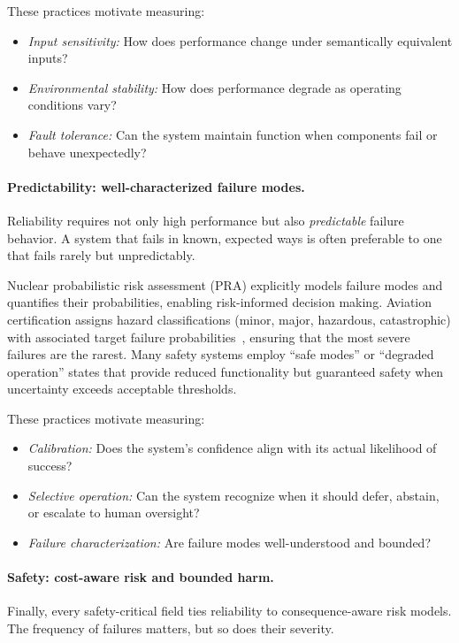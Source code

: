 \documentclass[11pt]{article}
\begin{document}
These practices motivate measuring:
\begin{itemize}[leftmargin=*, topsep=2pt]
    \item \emph{Input sensitivity:} How does performance change under semantically equivalent inputs?
    \item \emph{Environmental stability:} How does performance degrade as operating conditions vary?
    \item \emph{Fault tolerance:} Can the system maintain function when components fail or behave unexpectedly?
\end{itemize}

\paragraph{Predictability: well-characterized failure modes.}
Reliability requires not only high performance but also \emph{predictable} failure behavior.
A system that fails in known, expected ways is often preferable to one that fails rarely but unpredictably.

Nuclear probabilistic risk assessment (PRA) explicitly models failure modes and quantifies their probabilities, enabling risk-informed decision making.
Aviation certification assigns hazard classifications (minor, major, hazardous, catastrophic) with associated target failure probabilities~\citep{saearp4761}, ensuring that the most severe failures are the rarest.
Many safety systems employ ``safe modes'' or ``degraded operation'' states that provide reduced functionality but guaranteed safety when uncertainty exceeds acceptable thresholds.

These practices motivate measuring:
\begin{itemize}[leftmargin=*, topsep=2pt]
    \item \emph{Calibration:} Does the system's confidence align with its actual likelihood of success?
    \item \emph{Selective operation:} Can the system recognize when it should defer, abstain, or escalate to human oversight?
    \item \emph{Failure characterization:} Are failure modes well-understood and bounded?
\end{itemize}

\paragraph{Safety: cost-aware risk and bounded harm.}
Finally, every safety-critical field ties reliability to consequence-aware risk models.
The frequency of failures matters, but so does their severity.
\end{document}
